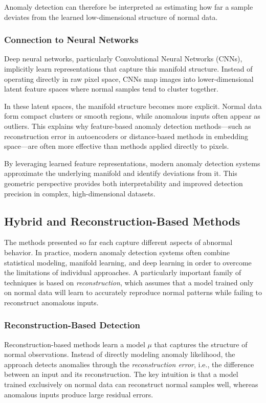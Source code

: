\documentclass{article}
\begin{document}
Anomaly detection can therefore be interpreted as estimating how far a sample
deviates from the learned low-dimensional structure of normal data.

\subsubsection{Connection to Neural Networks}

Deep neural networks, particularly Convolutional Neural Networks (CNNs),
implicitly learn representations that capture this manifold structure.
Instead of operating directly in raw pixel space, CNNs map images into
lower-dimensional latent feature spaces where normal samples tend to cluster
together.

In these latent spaces, the manifold structure becomes more explicit.
Normal data form compact clusters or smooth regions, while anomalous inputs
often appear as outliers. This explains why feature-based anomaly detection
methods—such as reconstruction error in autoencoders or distance-based methods
in embedding space—are often more effective than methods applied directly to
pixels.

By leveraging learned feature representations, modern anomaly detection systems
approximate the underlying manifold and identify deviations from it. This
geometric perspective provides both interpretability and improved detection
precision in complex, high-dimensional datasets.

\subsection{Hybrid and Reconstruction-Based Methods}

The methods presented so far each capture different aspects of abnormal
behavior. In practice, modern anomaly detection systems often combine
statistical modeling, manifold learning, and deep learning in order to
overcome the limitations of individual approaches. A particularly important
family of techniques is based on \emph{reconstruction}, which assumes that a
model trained only on normal data will learn to accurately reproduce normal
patterns while failing to reconstruct anomalous inputs.

\subsubsection{Reconstruction-Based Detection}

Reconstruction-based methods learn a model $\mu$ that captures the structure
of normal observations. Instead of directly modeling anomaly likelihood, the
approach detects anomalies through the \emph{reconstruction error}, i.e., the
difference between an input and its reconstruction. The key intuition is that
a model trained exclusively on normal data can reconstruct normal samples well,
whereas anomalous inputs produce large residual errors.
\end{document}
